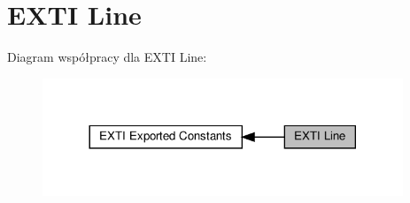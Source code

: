 \hypertarget{group___e_x_t_i___line}{}\section{E\+X\+TI Line}
\label{group___e_x_t_i___line}
Diagram współpracy dla E\+X\+TI Line\+:\nopagebreak
\begin{figure}[H]
\begin{center}
\leavevmode
\includegraphics[width=305pt]{group___e_x_t_i___line}
\end{center}
\end{figure}
